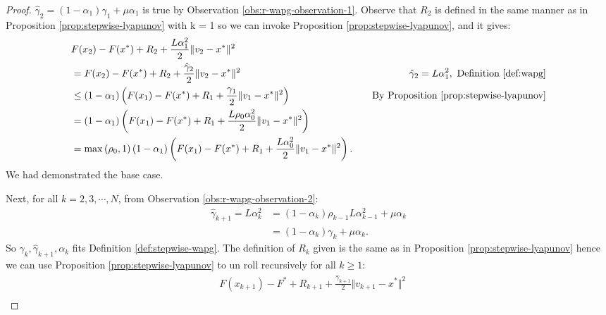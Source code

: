 \documentclass[12pt]{article}
\begin{document}
    \begin{proof}  
        $\hat \gamma_2 = (1 - \alpha_1)\gamma_1 + \mu \alpha_1$ is true by Observation \ref{obs:r-wapg-observation-1}. 
        Observe that $R_2$ is defined in the same manner as in Proposition \ref{prop:stepwise-lyapunov} with k = 1 so we can invoke Proposition \ref{prop:stepwise-lyapunov}, and it gives: 
        \begin{align*}
            & F(x_{2}) - F(x^*) + R_2 + \frac{L \alpha_1^2}{2}\Vert v_{2} - x^*\Vert^2
            \\
            & = F(x_{2}) - F(x^*) + R_2 + \frac{\hat \gamma_{2}}{2}\Vert v_{2} - x^*\Vert^2
            & \hat \gamma_2 = L \alpha_1^2 , \text{ Definition \ref{def:wapg}}
            \\
            &\le 
            (1 - \alpha_1)\left(
                F(x_1) - F(x^*) + R_1 + \frac{\gamma_1}{2}\Vert v_1 - x^*\Vert^2
            \right) 
            & \quad \text{By Proposition \ref{prop:stepwise-lyapunov}}
            \\
            &= 
            (1 - \alpha_1)\left(
                F(x_1) - F(x^*) + R_1 + \frac{L\rho_{0}\alpha_{0}^2}{2}\Vert v_1 - x^*\Vert^2
            \right) 
            \\
            &= \max\left(\rho_0, 1\right)
            (1 - \alpha_1)\left(
                F(x_1) - F(x^*) + R_1 + \frac{L\alpha_0^2}{2}\Vert v_1 - x^*\Vert^2
            \right). 
        \end{align*}
        We had demonstrated the base case. 
        \par 
        Next, for all $k = 2, 3, \cdots, N$, from Observation \ref{obs:r-wapg-observation-2}: 
        \begin{align*}
            \hat \gamma_{k + 1} = L\alpha_{k}^2 
            &=(1 - \alpha_k)\rho_{k - 1}L\alpha_{k - 1}^2 + \mu\alpha_k
            \\
            &= (1 - \alpha_k)\gamma_k + \mu\alpha_k. 
        \end{align*}
        So $\gamma_k, \hat \gamma_{k + 1}, \alpha_k$ fits Definition \ref{def:stepwise-wapg}. 
        The definition of $R_k$ given is the same as in Proposition \ref{prop:stepwise-lyapunov} hence we can use Proposition \ref{prop:stepwise-lyapunov} to un roll recursively for all $k \ge 1$: 
        {\small
        \begin{align*}
            &
            F(x_{k + 1}) - F^* + R_{k + 1} + \frac{\hat\gamma_{k + 1}}{2}\Vert v_{k + 1} - x^*\Vert^2 
            \\

\end{align*}}
\end{proof}
\end{document}

